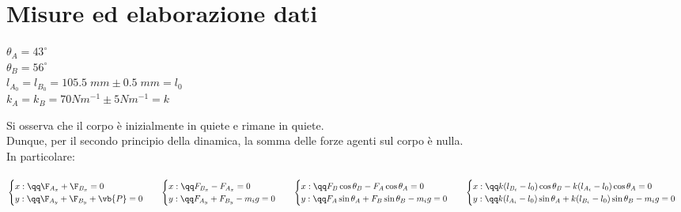 \section*{Misure ed elaborazione dati}
\everymath{\displaystyle}
$\theta_A = 43^\circ$\\ 
$\theta_B = 56^\circ$\\ 
$l_{A_0} = l_{B_0} = 105.5\;mm \pm 0.5\;mm = l_0$\\ 
$k_A = k_B = 70 Nm^{-1} \pm 5 Nm^{-1} = k$

\snls 
Si osserva che il corpo è inizialmente in quiete e rimane in quiete.\\ 
Dunque, per il secondo principio della dinamica, la somma delle forze agenti sul corpo è nulla.\\ 
In particolare:\\ \\
$
\begin{cases}
    x: \qq \F_{A_x} + \F_{B_x} = 0\\
    y: \qq \F_{A_y} + \F_{B_y} + \vb{P} = 0
\end{cases}
\\ 
\phantom{A}
\\
\begin{cases}
    x: \qq  F_{B_x} - F_{A_x} = 0\\
    y: \qq F_{A_y} + F_{B_y}  -m_ig = 0
\end{cases} 
\\
\phantom{A}
\\
\begin{cases}
    x: \qq  F_{B} \cos \theta_B - F_{A} \cos \theta_A = 0\\
    y: \qq F_{A}\sin \theta_A  + F_{B}\sin \theta_B -m_ig  = 0
\end{cases} 
\\ 
\phantom{A}
\\
\begin{cases}
    x: \qq  k (l_{B_i} - l_0) \cos \theta_B - k (l_{A_i} - l_0) \cos \theta_A = 0\\
    y: \qq k (l_{A_i} - l_0)\sin \theta_A  + k (l_{B_i} - l_0)\sin \theta_B -m_ig  = 0
\end{cases} 
$ 

